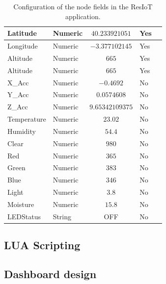\begin{itemize}
\begin{table}[H]
\begin{center}
\begin{tabular}{|p{} | p{} |c| p{}| p{}|}
                \hline
                Latitude & Numeric & $40.233921051$ & Yes \\
                \hline
                Longitude & Numeric & $-3.377102145$ & Yes \\
                \hline
                Altitude & Numeric & $665$ & Yes \\
                \hline
                Altitude & Numeric & $665$ & Yes \\
                \hline
                X\_Acc & Numeric & $-0.4692$ & No \\
                \hline
                Y\_Acc & Numeric & $0.0574608$ & No \\
                \hline
                Z\_Acc & Numeric & $9.65342109375$ & No \\
                \hline
                Temperature & Numeric & $23.02$ & No \\
                \hline
                Humidity & Numeric & $54.4$ & No \\
                \hline
                Clear & Numeric & $980$ & No \\
                \hline
                Red & Numeric & $365$ & No \\
                \hline
                Green & Numeric & $383$ & No \\
                \hline
                Blue & Numeric & $346$ & No \\
                \hline
                Light & Numeric & $3.8$ & No \\
                \hline
                Moisture & Numeric & $15.8$ & No \\
                \hline
                LEDStatus & String & OFF & No \\
                \hline
            \end{tabular}
        \end{center}
        \caption{Configuration of the node fields in the ResIoT application.}
        \label{Connections3}
    \end{table}
\end{itemize}
\clearpage
\subsection{LUA Scripting}
\clearpage
\subsection{Dashboard design}
\clearpage